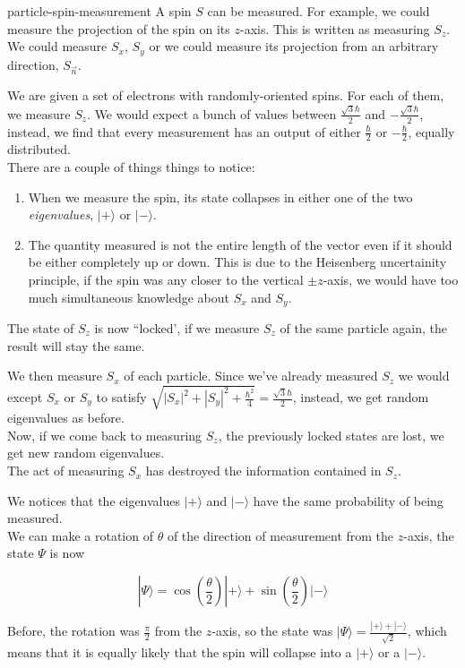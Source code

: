 \documentclass[preview]{standalone}
\begin{document}
\begin{snippet}{particle-spin-measurement}
    A spin \(S\) can be measured. For example, we could measure the projection of the spin on its \(z\)-axis.
    This is written as measuring \(S_z\). We could measure \(S_x\), \(S_y\) or we could measure its projection from an arbitrary direction, \(S_{\vec{n}}\).

    We are given a set of electrons with randomly-oriented spins. For each of them, we measure \(S_z\).
    We would expect a bunch of values between \(\frac{\sqrt{3}\hbar}{2}\) and \(-\frac{\sqrt{3}\hbar}{2}\),
    instead, we find that every measurement has an output of either \(\frac{\hbar}{2}\) or \(-\frac{\hbar}{2}\), equally distributed. \\
    There are a couple of things things to notice:

    \begin{enumerate}
        \item When we measure the spin, its state collapses in either one of the two \textit{eigenvalues}, \(|+\rangle\) or \(|-\rangle\).
        \item The quantity measured is not the entire length of the vector even if it should be either completely up or down.
            This is due to the Heisenberg uncertainity principle, if the spin was any closer to the vertical \(\pm z\)-axis,
            we would have too much simultaneous knowledge about \(S_x\) and \(S_y\).
    \end{enumerate}

    The state of \(S_z\) is now ``locked', if we measure \(S_z\) of the same particle again, the result will stay the same.

    We then measure \(S_x\) of each particle. Since we've already measured \(S_z\) we would except \(S_x\) or \(S_y\)
    to satisfy \(\sqrt{{|S_x|}^2 + {|S_y|}^2 + \frac{\hbar^2}{4}} = \frac{\sqrt{3}\hbar}{2}\), instead, we get random eigenvalues as before. \\
    Now, if we come back to measuring \(S_z\), the previously locked states are lost, we get new random eigenvalues. \\
    The act of measuring \(S_x\) has destroyed the information contained in \(S_z\).

    We notices that the eigenvalues \(|+\rangle\) and \(|-\rangle\) have the same probability of being measured. \\
    We can make a rotation of \(\theta\) of the direction of measurement from the \(z\)-axis, the state \(\Psi\) is now

    \[
        |\Psi\rangle = \cos\left(\frac{\theta}{2}\right) |+\rangle + \sin\left(\frac{\theta}{2}\right)|-\rangle
    \]

    Before, the rotation was \(\frac{\pi}{2}\) from the \(z\)-axis, so the state was \(|\Psi\rangle=\frac{|+\rangle + |-\rangle}{\sqrt{2}}\),
    which means that it is equally likely that the spin will collapse into a \(|+\rangle\) or a \(|-\rangle\).
\end{snippet}
\end{document}
